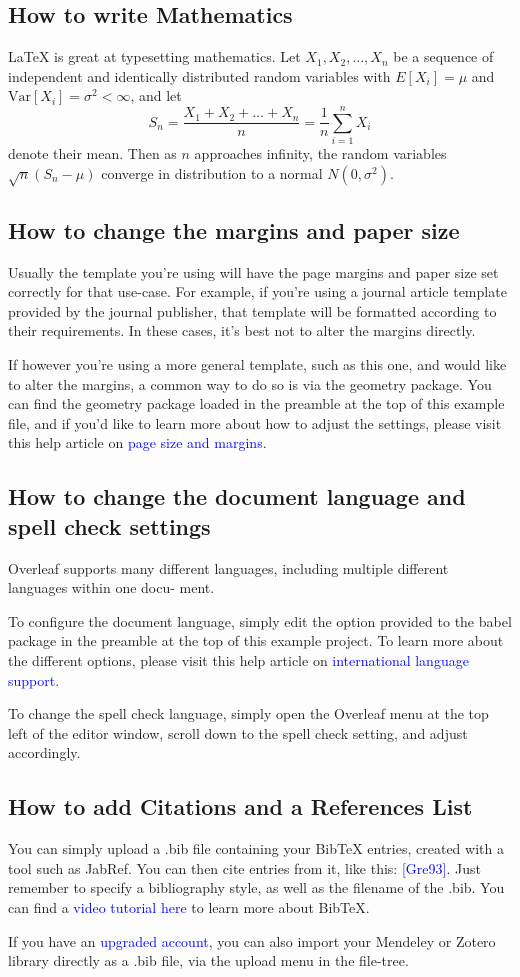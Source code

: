 \documentclass{article}
\begin{document}
\subsection{How to write Mathematics}
\LaTeX{} is great at typesetting mathematics. Let $X_1, X_2, \ldots, X_n$ be a sequence of independent and identically distributed random variables with $E[X_i] = \mu$ and $\text{Var}[X_i] = \sigma^2 < \infty$, and let
\[
S_n = \frac{X_1 + X_2 + \ldots + X_n}{n} =  \frac{1}{n} \sum_{i=1}^{n} X_i
\]
denote their mean. Then as $n$ approaches infinity, the random variables $\sqrt{n}(S_n - \mu)$ converge in distribution to a normal $N(0, \sigma^2)$.


\subsection{How to change the margins and paper size}
Usually the template you’re using will have the page margins and paper size set correctly for that
use-case. For example, if you’re using a journal article template provided by the journal publisher,
that template will be formatted according to their requirements. In these cases, it’s best not to alter
the margins directly.
\par{}If however you’re using a more general template, such as this one, and would like to alter the
margins, a common way to do so is via the geometry package. You can find the geometry package
loaded in the preamble at the top of this example file, and if you’d like to learn more about how to
adjust the settings, please visit this help article on \textcolor{blue}{page size and margins}.
\subsection{How to change the document language and spell check settings }
Overleaf supports many different languages, including multiple different languages within one docu-
ment.  
\par{}To configure the document language, simply edit the option provided to the babel package in the
preamble at the top of this example project. To learn more about the different options, please visit
this help article on
\textcolor{blue}{international language support}.\par{}
To change the spell check language, simply open the Overleaf menu at the top left of the editor
window, scroll down to the spell check setting, and adjust accordingly.
\subsection{How to add Citations and a References List}
You can simply upload a .bib file containing your BibTeX entries, created with a tool such as JabRef.
You can then cite entries from it, like this:\textcolor{blue}{ [Gre93]}. Just remember to specify a bibliography style, as
well as the filename of the .bib. You can find a \textcolor{blue}{video tutorial here} to learn more about BibTeX.
\par{}If you have an \textcolor{blue}{upgraded account}, you can also import your Mendeley or Zotero library directly as
a .bib file, via the upload menu in the file-tree.
\end{document}

